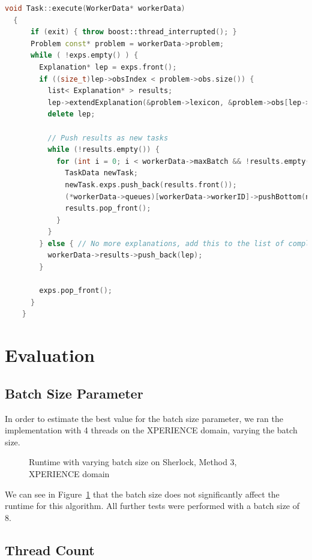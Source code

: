 \documentclass[12pt,twoside,abbrevs,msc,ai,notimes,logo,sansheadings]{infthesis}
\begin{document}
\begin{lstlisting}[language=C++]
  void Task::execute(WorkerData* workerData)
  {
      if (exit) { throw boost::thread_interrupted(); }
      Problem const* problem = workerData->problem;
      while ( !exps.empty() ) {
        Explanation* lep = exps.front();
        if ((size_t)lep->obsIndex < problem->obs.size()) {
          list< Explanation* > results;
          lep->extendExplanation(&problem->lexicon, &problem->obs[lep->obsIndex], &results);
          delete lep;

          // Push results as new tasks
          while (!results.empty()) {
            for (int i = 0; i < workerData->maxBatch && !results.empty(); ++i) {
              TaskData newTask;
              newTask.exps.push_back(results.front());
              (*workerData->queues)[workerData->workerID]->pushBottom(newTask);
              results.pop_front();
            }
          }
        } else { // No more explanations, add this to the list of completed explanations
          workerData->results->push_back(lep);
        }

        exps.pop_front();
      }
    }
  \end{lstlisting}

  
  \section{Evaluation}
  
  \subsection{Batch Size Parameter}
  
  In order to estimate the best value for the batch size parameter, we ran the implementation with 4 threads on the XPERIENCE domain, varying the batch size.
  
  \begin{figure}[!htbp]
  \begin{centering}
  \texttt{[image: \{\{images/batch-xper5-sherlock-3-1]}}}
  \par\end{centering}
  \caption{Runtime with varying batch size on Sherlock, Method 3, XPERIENCE domain}
  \label{fig:batch-3}
  \end{figure}
  
  We can see in Figure~\ref{fig:batch-3} that the batch size does not significantly affect the runtime for this algorithm. All further tests were performed with a batch size of 8.
  
  \subsection{Thread Count}
  
\end{document}
